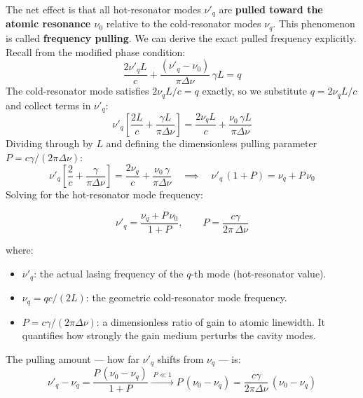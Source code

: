 The net effect is that all hot-resonator modes $\nu'_q$ are \textbf{pulled toward the atomic resonance $\nu_0$} relative to the cold-resonator modes $\nu_q$. This phenomenon is called \textbf{frequency pulling}. We can derive the exact pulled frequency explicitly. Recall from the modified phase condition:
\begin{equation*}
    \frac{2\nu'_q L}{c} + \frac{(\nu'_q - \nu_0)}{\pi\Delta\nu}\,\gamma L = q
\end{equation*}
The cold-resonator mode satisfies $2\nu_q L/c = q$ exactly, so we substitute $q = 2\nu_q L/c$ and collect terms in $\nu'_q$:
\begin{equation*}
    \nu'_q\!\left[\frac{2L}{c} + \frac{\gamma L}{\pi\Delta\nu}\right] = \frac{2\nu_q L}{c} + \frac{\nu_0\,\gamma L}{\pi\Delta\nu}
\end{equation*}
Dividing through by $L$ and defining the dimensionless pulling parameter $P = c\gamma/(2\pi\Delta\nu)$:
\begin{equation*}
    \nu'_q\!\left[\frac{2}{c} + \frac{\gamma}{\pi\Delta\nu}\right] = \frac{2\nu_q}{c} + \frac{\nu_0\,\gamma}{\pi\Delta\nu}
    \quad\implies\quad
    \nu'_q\,(1 + P) = \nu_q + P\,\nu_0
\end{equation*}
Solving for the hot-resonator mode frequency:
\begin{keyresult}
    \begin{equation}
        \nu'_q = \frac{\nu_q + P\,\nu_0}{1 + P}, \qquad P = \frac{c\gamma}{2\pi\,\Delta\nu}
    \end{equation}
\end{keyresult}
where:
\begin{itemize}
    \item $\nu'_q$: the actual lasing frequency of the $q$-th mode (hot-resonator value).
    \item $\nu_q = qc/(2L)$: the geometric cold-resonator mode frequency.
    \item $P = c\gamma/(2\pi\Delta\nu)$: a dimensionless ratio of gain to atomic linewidth. It quantifies how strongly the gain medium perturbs the cavity modes.
\end{itemize}

The pulling amount --- how far $\nu'_q$ shifts from $\nu_q$ --- is:
\begin{equation*}
    \nu'_q - \nu_q = \frac{P\,(\nu_0 - \nu_q)}{1 + P}
    \xrightarrow{\;P\ll 1\;}
    P\,(\nu_0 - \nu_q) = \frac{c\gamma}{2\pi\Delta\nu}\,(\nu_0 - \nu_q)
\end{equation*}

